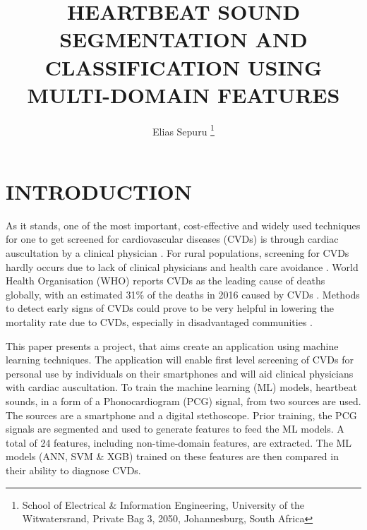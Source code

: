 \documentclass[10pt,twocolumn]{witseiepaper}
\begin{document}

\title{\centering HEARTBEAT SOUND SEGMENTATION AND CLASSIFICATION USING MULTI-DOMAIN FEATURES}

\author{Elias Sepuru
\thanks{School of Electrical \& Information Engineering, University of the
Witwatersrand, Private Bag 3, 2050, Johannesburg, South Africa}
}


%



\maketitle
\thispagestyle{empty}\pagestyle{empty}


%
\section{INTRODUCTION}
\label{intro}
As it stands, one of the most important, cost-effective and widely used techniques for one to get screened for cardiovascular diseases (CVDs) is through cardiac auscultation by a clinical physician \cite{28_gavrovska2017identification, 32_montinari2019first}. For rural populations, screening for CVDs hardly occurs due to lack of clinical physicians and health care avoidance \cite{33,34}. World Health Organisation (WHO) reports CVDs as the leading cause of deaths globally, with an estimated 31\% of the deaths in 2016 caused by CVDs \cite{WHO}. Methods to detect early signs of CVDs could prove to be very helpful in lowering the mortality rate due to CVDs, especially in disadvantaged communities \cite{34}.

This paper presents a project, that aims create an application using machine learning techniques. The application will enable first level screening of CVDs for personal use by individuals on their smartphones and will aid clinical physicians with cardiac auscultation. To train the machine learning (ML) models, heartbeat sounds, in a form of a Phonocardiogram (PCG) signal, from two sources are used. The sources are a smartphone and a digital stethoscope. Prior training, the PCG signals are segmented and used to generate features to feed the ML models. A total of 24 features, including non-time-domain features, are extracted. The ML models (ANN, SVM \& XGB) trained on these features are then compared in their ability to diagnose CVDs.
\end{document}
